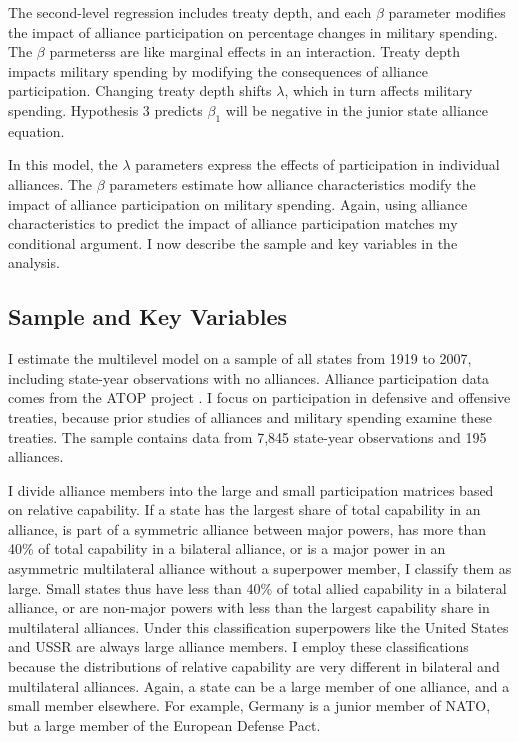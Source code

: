 \documentclass[12pt]{article}
\begin{document}
The second-level regression includes treaty depth, and each $\beta$ parameter modifies the impact of alliance participation on percentage changes in military spending. 
The $\beta$ parmeterss are like marginal effects in an interaction. 
Treaty depth impacts military spending by modifying the consequences of alliance participation. 
Changing treaty depth shifts $\lambda$, which in turn affects military spending.
Hypothesis 3 predicts $\beta_1$ will be negative in the junior state alliance equation. 


In this model, the $\lambda$ parameters express the effects of participation in individual alliances.
The $\beta$ parameters estimate how alliance characteristics modify the impact of alliance participation on military spending.  
Again, using alliance characteristics to predict the impact of alliance participation matches my conditional argument. 
I now describe the sample and key variables in the analysis.  



\subsection{Sample and Key Variables} 

I estimate the multilevel model on a sample of all states from 1919 to 2007, including state-year observations with no alliances. 
Alliance participation data comes from the ATOP project \citep{Leedsetal2002}.  
I focus on participation in defensive and offensive treaties, because prior studies of alliances and military spending examine these treaties. 
The sample contains data from 7,845 state-year observations and 195 alliances. 


I divide alliance members into the large and small participation matrices based on relative capability. 
If a state has the largest share of total capability in an alliance, is part of a symmetric alliance between major powers, has more than 40\% of total capability in a bilateral alliance, or is a major power in an asymmetric multilateral alliance without a superpower member, I classify them as large. 
Small states thus have less than 40\% of total allied capability in a bilateral alliance, or are non-major powers with less than the largest capability share in multilateral alliances. 
Under this classification superpowers like the United States and USSR are always large alliance members. 
I employ these classifications because the distributions of relative capability are very different in bilateral and multilateral alliances. 
Again, a state can be a large member of one alliance, and a small member elsewhere. 
For example, Germany is a junior member of NATO, but a large member of the European Defense Pact.
\end{document}
